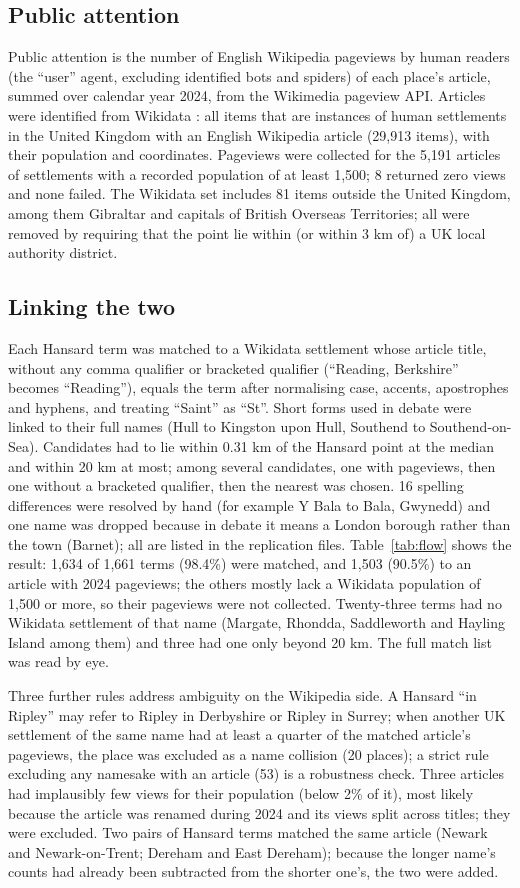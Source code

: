 \documentclass[11pt,a4paper]{article}
\begin{document}
\subsection{Public attention}
Public attention is the number of English Wikipedia pageviews by human readers (the ``user'' agent, excluding identified bots and spiders) of each place's article, summed over calendar year 2024, from the Wikimedia pageview API. Articles were identified from Wikidata \citep{Vrandecic2014}: all items that are instances of human settlements in the United Kingdom with an English Wikipedia article (29,913 items), with their population and coordinates. Pageviews were collected for the 5,191 articles of settlements with a recorded population of at least 1,500; 8 returned zero views and none failed. The Wikidata set includes 81 items outside the United Kingdom, among them Gibraltar and capitals of British Overseas Territories; all were removed by requiring that the point lie within (or within 3 km of) a UK local authority district.

\subsection{Linking the two}
Each Hansard term was matched to a Wikidata settlement whose article title, without any comma qualifier or bracketed qualifier (``Reading, Berkshire'' becomes ``Reading''), equals the term after normalising case, accents, apostrophes and hyphens, and treating ``Saint'' as ``St''. Short forms used in debate were linked to their full names (Hull to Kingston upon Hull, Southend to Southend-on-Sea). Candidates had to lie within 0.31 km of the Hansard point at the median and within 20 km at most; among several candidates, one with pageviews, then one without a bracketed qualifier, then the nearest was chosen. 16 spelling differences were resolved by hand (for example Y Bala to Bala, Gwynedd) and one name was dropped because in debate it means a London borough rather than the town (Barnet); all are listed in the replication files. Table~\ref{tab:flow} shows the result: 1,634 of 1,661 terms (98.4\%) were matched, and 1,503 (90.5\%) to an article with 2024 pageviews; the others mostly lack a Wikidata population of 1,500 or more, so their pageviews were not collected. Twenty-three terms had no Wikidata settlement of that name (Margate, Rhondda, Saddleworth and Hayling Island among them) and three had one only beyond 20 km. The full match list was read by eye.

Three further rules address ambiguity on the Wikipedia side. A Hansard ``in Ripley'' may refer to Ripley in Derbyshire or Ripley in Surrey; when another UK settlement of the same name had at least a quarter of the matched article's pageviews, the place was excluded as a name collision (20 places); a strict rule excluding any namesake with an article (53) is a robustness check. Three articles had implausibly few views for their population (below 2\% of it), most likely because the article was renamed during 2024 and its views split across titles; they were excluded. Two pairs of Hansard terms matched the same article (Newark and Newark-on-Trent; Dereham and East Dereham); because the longer name's counts had already been subtracted from the shorter one's, the two were added.
\end{document}
